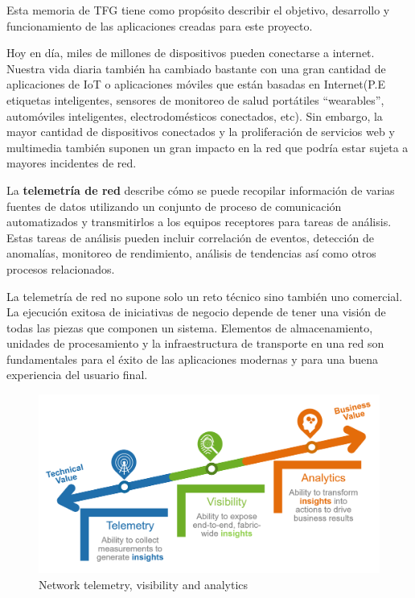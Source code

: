     Esta memoria de \gls{TFG} tiene como propósito describir el objetivo, desarrollo y funcionamiento de las aplicaciones creadas para este proyecto.
    
    Hoy en día, miles de millones de dispositivos pueden conectarse a internet. Nuestra vida diaria también ha cambiado bastante con una gran cantidad de aplicaciones de IoT o aplicaciones móviles que están basadas en Internet(P.E etiquetas inteligentes, sensores de monitoreo de salud portátiles \enquote{wearables}, automóviles inteligentes, electrodomésticos conectados, etc). Sin embargo, la mayor cantidad de dispositivos conectados y la proliferación de servicios web y multimedia también suponen un gran impacto en la red que podría estar sujeta a mayores incidentes de red. 
    
    La \textbf{telemetría de red} describe cómo se puede recopilar información de varias fuentes de datos utilizando un conjunto de proceso de comunicación automatizados y transmitirlos a los equipos receptores para tareas de análisis. Estas tareas de análisis pueden incluir correlación de eventos, detección de anomalías, monitoreo de rendimiento, análisis de tendencias así como otros procesos relacionados. 
    
    La telemetría de red no supone solo un reto técnico sino también uno comercial. La ejecución exitosa de iniciativas de negocio depende de tener una visión de todas las piezas que componen un sistema. Elementos de almacenamiento, unidades de procesamiento y la infraestructura de transporte en una red son fundamentales para el éxito de las aplicaciones modernas y para una buena experiencia del usuario final. 
    
    \begin{figure}[H]
        \centering
        \includegraphics[scale=0.18]{graphics/Telemetry-Visibility-Analytics.png}
        \caption{Network telemetry, visibility and analytics}
        \label{fig:Telemetry_bussinesss}
    \end{figure}
    

